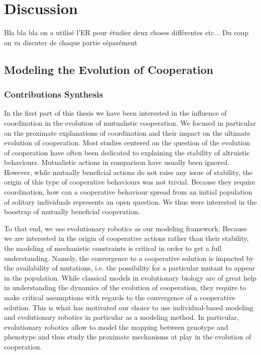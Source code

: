 \chapter{Discussion}


\minitoc[n] %

Bla bla bla on a utilisé l'ER pour étudier deux choses différentes etc...
Du coup on va discuter de chaque partie séparément

\section{Modeling the Evolution of Cooperation}

	\subsection{Contributions Synthesis} %


		In the first part of this thesis we have been interested in the influence of coordination in the evolution of mutualistic cooperation. We focused in particular on the proximate explanations of coordination and their impact on the ultimate evolution of cooperation. Most studies centered on the question of the evolution of cooperation have often been dedicated to explaining the stability of altruistic behaviours. Mutualistic actions in comparison have usually been ignored. However, while mutually beneficial actions do not raise any issue of stability, the origin of this type of cooperative behaviours was not trivial. Because they require coordination, how can a cooperative behaviour spread from an initial population of solitary individuals represents an open question. We thus were interested in the boostrap of mutually beneficial cooperation.

		To that end, we use evolutionary robotics as our modeling framework. Because we are interested in the origin of cooperative actions rather than their stability, the modeling of mechanistic constraints is critical in order to get a full understanding. Namely, the convergence to a cooperative solution is impacted by the availability of mutations, i.e. the possibility for a particular mutant to appear in the population. While classical models in evolutionary biology are of great help in understanding the dynamics of the evolution of cooperation, they require to make critical assumptions with regards to the convergence of a cooperative solution. This is what has motivated our choice to use individual-based modeling and evolutionary robotics in particular as a modeling method. In particular, evolutionary robotics allow to model the mapping between genotype and phenotype and thus study the proximate mechanisms at play in the evolution of cooperation.

